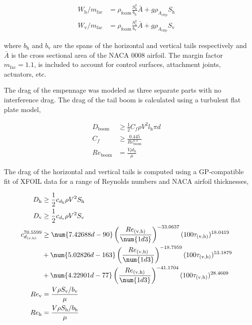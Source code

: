 \begin{align}
    \label{e:htweight}
    W_{\text{h}}/m_{\text{fac}} &= \rho_{\text{foam}} \frac{S_{\text{h}}^2}{b_{\text{h}}} \bar{A} + g\rho_{A_{\text{cfrp}}} S_{\text{h}} \\
    \label{e:vtweight}
    W_{\text{v}}/m_{\text{fac}} &= \rho_{\text{foam}} \frac{S_{\text{v}}^2}{b_{\text{v}}} \bar{A} + g\rho_{A_{\text{cfrp}}} S_{\text{v}}
\end{align}

where $b_{\text{h}}$ and $b_{\text{v}}$ are the spans of the horizontal and vertical tails respectively and $\bar{A}$ is the cross sectional area of the NACA 0008 airfoil. The margin factor $m_{\text{fac}}=1.1$, is included to account for control surfaces, attachment joints, actuators, etc. 

The drag of the empennage was modeled as three separate parts with no interference drag.  The drag of the tail boom is calculated using a turbulent flat plate model,

\begin{align}
    \label{e:boomdrag}
    D_{\text{boom}} &\geq \frac{1}{2} C_f \rho V^2 l_{\text{h}}\pi d \\
    C_f &\geq \frac{0.445}{Re_{\text{boom}}^{0.3}} \\
    Re_{\text{boom}} &= \frac{V\rho l_{\text{h}}}{\mu}
\end{align}

The drag of the horizontal and vertical tails is computed using a GP-compatible fit of XFOIL data for a range of Reynolds numbers and NACA airfoil thicknesses,

\begin{align}
    D_{\text{h}} &\geq \frac{1}{2} c_{d_{\text{h}}} \rho V^2 S_{\text{h}} \\
    D_{\text{v}} &\geq \frac{1}{2} c_{d_{\text{v}}} \rho V^2 S_{\text{v}} \\
    \label{e:taildrag}
    c_{d_{\text{(v,h)}}}^{70.5599} &\geq \num{7.42688d-90} \left( \frac{Re_{\text{(v,h)}}}{\num{1d3}} \right)^{-33.0637}(100 \tau_{\text{(v,h)}})^{18.0419}  \nonumber \\
                 & + \num{5.02826d-163}\left(\frac{Re_{\text{(v,h)}}}{\num{1d3}}\right)^{-18.7959} (100\tau_{\text{(v,h)}})^{53.1879} \\
                 &+ \num{4.22901d-77}\left(\frac{Re_{\text{(v,h)}}}{\num{1d3}}\right)^{-41.1704} (100\tau_{\text{(v,h)}})^{28.4609} \nonumber \\
    Re_{\text{v}} &= \frac{V\rho S_{\text{v}}/b_{\text{v}}}{\mu} \\
    Re_{\text{h}} &= \frac{V\rho S_{\text{h}}/b_{\text{h}}}{\mu} 
\end{align}

